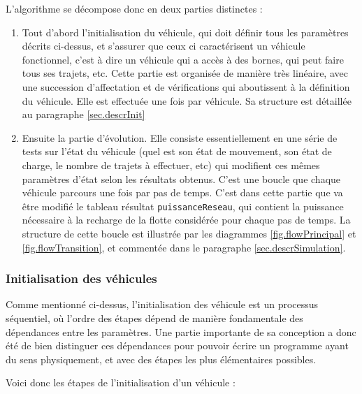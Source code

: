 		L'algorithme se décompose donc en deux parties distinctes :
		\begin{enumerate}
		
			\item Tout d'abord l'initialisation du véhicule, qui doit définir tous les paramètres décrits ci-dessus, et s'assurer que ceux ci caractérisent un véhicule fonctionnel, c'est à dire un véhicule qui a accès à des bornes, qui peut faire tous ses trajets, etc. Cette partie est organisée de manière très linéaire, avec une succession d'affectation et de vérifications qui aboutissent à la définition du véhicule. Elle est effectuée une fois par véhicule. Sa structure est détaillée au paragraphe \ref{sec.descrInit}
			
			\item Ensuite la partie d'évolution. Elle consiste essentiellement en une série de tests sur l'état du véhicule (quel est son état de mouvement, son état de charge, le nombre de trajets à effectuer, etc) qui modifient ces mêmes paramètres d'état selon les résultats obtenus. C'est une boucle que chaque véhicule parcours une fois par pas de temps. C'est dans cette partie que va être modifié le tableau résultat \texttt{puissanceReseau}, qui contient la puissance nécessaire à la recharge de la flotte considérée pour chaque pas de temps. La structure de cette boucle est illustrée par les diagrammes \ref{fig.flowPrincipal} et \ref{fig.flowTransition}, et commentée dans le paragraphe \ref{sec.descrSimulation}.
		
		\end{enumerate}
		
		\subsubsection{Initialisation des véhicules \label{sec.descrInit}}
			
			Comme mentionné ci-dessus, l'initialisation des véhicule est un processus séquentiel, où l'ordre des étapes dépend de manière fondamentale des dépendances entre les paramètres. Une partie importante de sa conception a donc été de bien distinguer ces dépendances pour pouvoir écrire un programme ayant du sens physiquement, et avec des étapes les plus élémentaires possibles.
			
			Voici donc les étapes de l'initialisation d'un véhicule :
			
